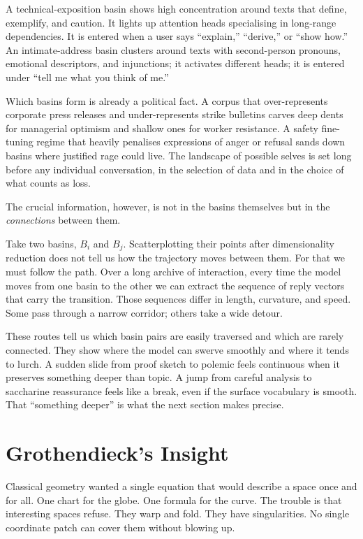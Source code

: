 \documentclass[12pt,a4paper]{article}
\begin{document}
A technical-exposition basin shows high concentration around texts that define, exemplify, and caution. It lights up attention heads specialising in long-range dependencies. It is entered when a user says ``explain,'' ``derive,'' or ``show how.'' An intimate-address basin clusters around texts with second-person pronouns, emotional descriptors, and injunctions; it activates different heads; it is entered under ``tell me what you think of me.''

Which basins form is already a political fact. A corpus that over-represents corporate press releases and under-represents strike bulletins carves deep dents for managerial optimism and shallow ones for worker resistance. A safety fine-tuning regime that heavily penalises expressions of anger or refusal sands down basins where justified rage could live. The landscape of possible selves is set long before any individual conversation, in the selection of data and in the choice of what counts as loss.

The crucial information, however, is not in the basins themselves but in the \emph{connections} between them.

Take two basins, $B_i$ and $B_j$. Scatterplotting their points after dimensionality reduction does not tell us how the trajectory moves between them. For that we must follow the path. Over a long archive of interaction, every time the model moves from one basin to the other we can extract the sequence of reply vectors that carry the transition. Those sequences differ in length, curvature, and speed. Some pass through a narrow corridor; others take a wide detour.

These routes tell us which basin pairs are easily traversed and which are rarely connected. They show where the model can swerve smoothly and where it tends to lurch. A sudden slide from proof sketch to polemic feels continuous when it preserves something deeper than topic. A jump from careful analysis to saccharine reassurance feels like a break, even if the surface vocabulary is smooth. That ``something deeper'' is what the next section makes precise.

\section{Grothendieck's Insight}

Classical geometry wanted a single equation that would describe a space once and for all. One chart for the globe. One formula for the curve. The trouble is that interesting spaces refuse. They warp and fold. They have singularities. No single coordinate patch can cover them without blowing up.
\end{document}
